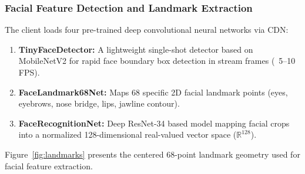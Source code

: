 \documentclass[12pt,a4paper,oneside]{article}
\begin{document}
\subsubsection{Facial Feature Detection and Landmark Extraction}
The client loads four pre-trained deep convolutional neural networks via CDN:
\begin{enumerate}
    \item \textbf{TinyFaceDetector:} A lightweight single-shot detector based on MobileNetV2 for rapid face boundary box detection in stream frames (~5–10 FPS).
    \item \textbf{FaceLandmark68Net:} Maps 68 specific 2D facial landmark points (eyes, eyebrows, nose bridge, lips, jawline contour).
    \item \textbf{FaceRecognitionNet:} Deep ResNet-34 based model mapping facial crops into a normalized 128-dimensional real-valued vector space ($\mathbb{R}^{128}$).
\end{enumerate}

Figure~\ref{fig:landmarks} presents the centered 68-point landmark geometry used for facial feature extraction.
\end{document}
